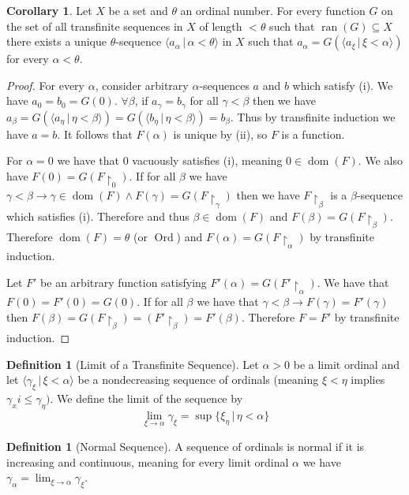 \documentclass{article}
\theoremstyle{definition}
\newtheorem{crly}[thm]{Corollary}
\newtheorem{defn}[thm]{Definition}
\DeclareMathOperator{\ran}{ran}
\DeclareMathOperator{\dom}{dom}
\DeclareMathOperator{\Ord}{Ord}
\begin{document}
\begin{crly}
    Let $X$ be a set and $\theta$ an ordinal number. For every function $G$ on the set of all transfinite sequences in $X$ of length $< \theta$ such that $\ran(G) \subseteq X$ there exists a unique $\theta$-sequence $\langle a_\alpha \, | \, \alpha < \theta \rangle$ in $X$ such that $a_\alpha = G(\langle a_\xi \, | \, \xi < \alpha \rangle)$ for every $\alpha < \theta$.
\end{crly}

\begin{proof}
    For every $\alpha$, consider arbitrary $\alpha$-sequences $a$ and $b$ which satisfy (i). We have $a_0 = b_0 = G(0)$. $\forall \beta$, if $a_\gamma = b_\gamma$ for all $\gamma < \beta$ then we have $a_\beta = G(\langle a_\eta \, | \, \eta < \beta \rangle) = G(\langle b_\eta \, | \, \eta < \beta \rangle) = b_\beta$. Thus by transfinite induction we have $a = b$. It follows that $F(\alpha)$ is unique by (ii), so $F$ is a function.

    For $\alpha = 0$ we have that $0$ vacuously satisfies (i), meaning $0 \in \dom(F)$. We also have $F(0) = G(F\restriction_0)$. If for all $\beta$ we have $\gamma < \beta \to \gamma \in \dom(F) \land F(\gamma) = G(F\restriction_\gamma)$ then we have $F\restriction_\beta$ is a $\beta$-sequence which satisfies (i). Therefore and thus $\beta \in \dom(F)$ and $F(\beta) = G(F\restriction_\beta)$. Therefore $\dom(F) = \theta$ (or $\Ord$) and $F(\alpha) = G(F\restriction_\alpha)$ by transfinite induction.

    Let $F'$ be an arbitrary function satisfying $F'(\alpha) = G(F' \restriction_\alpha)$. We have that $F(0) = F'(0) = G(0)$. If for all $\beta$ we have that $\gamma < \beta \to F(\gamma) = F'(\gamma)$ then $F(\beta) = G(F\restriction_\beta) = (F'\restriction_\beta) = F'(\beta)$. Therefore $F = F'$ by transfinite induction.
\end{proof}

\begin{defn}[Limit of a Transfinite Sequence]
    Let $\alpha > 0$ be a limit ordinal and let $\langle \gamma_\xi \, | \, \xi < \alpha \rangle$ be a nondecreasing sequence of ordinals (meaning $\xi < \eta$ implies $\gamma_xi \le \gamma_\eta)$. We define the limit of the sequence by 
    \[
        \lim_{\xi \to \alpha} \gamma_\xi = \sup\{\xi_\eta \, | \, \eta < \alpha\}    
    \]
\end{defn}

\begin{defn}[Normal Sequence]
    A sequence of ordinals is normal if it is increasing and continuous, meaning for every limit ordinal $\alpha$ we have $\gamma_\alpha = \lim_{\xi \to \alpha} \gamma_\xi$.
\end{defn}
\end{document}
